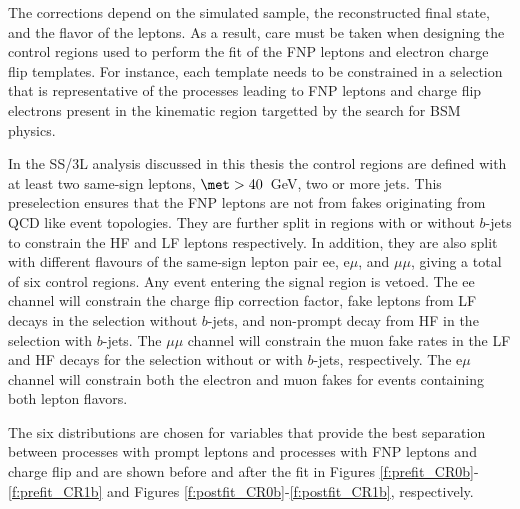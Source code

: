 The corrections depend on the simulated sample,
the reconstructed final state, and the flavor of the leptons. As a result, care must be taken when designing the control regions 
used to perform the fit of the FNP leptons and electron charge flip templates. 
For instance, each template needs to be constrained in a selection that is representative of the processes leading to 
FNP leptons and charge flip electrons present in the kinematic region targetted by the search for BSM physics. 

In the SS/3L analysis discussed in this thesis the control regions are defined with at least two same-sign 
leptons, $\met>40$~GeV, two or more jets. This preselection ensures that the FNP leptons are not from fakes originating from 
QCD like event topologies. 
They are further split in regions 
with or without $b$-jets to constrain the HF and LF leptons respectively. In addition, they are also split with different 
flavours of the same-sign lepton pair ee, e$\mu$, and $\mu\mu$, giving a total of six control regions. 
Any event entering the signal region is vetoed. The ee channel will constrain the charge flip correction factor, fake leptons 
 from LF decays in the selection without $b$-jets, and non-prompt decay from HF in the selection with $b$-jets. 
The $\mu\mu$ channel will constrain the muon fake rates in the LF and HF decays for the selection without or with $b$-jets, 
respectively. The e$\mu$ channel will constrain both the electron and muon fakes for events containing both lepton flavors. 

The six distributions are chosen for variables that provide the best separation between processes with prompt leptons and processes with FNP leptons and charge flip and are shown 
before and after the fit in Figures \ref{f:prefit_CR0b}-\ref{f:prefit_CR1b} and Figures \ref{f:postfit_CR0b}-\ref{f:postfit_CR1b}, respectively. 

